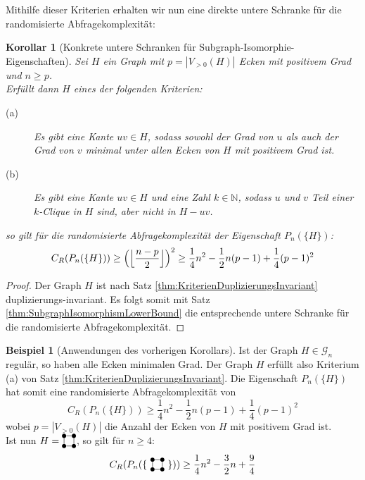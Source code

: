 \documentclass[10pt,a4paper, footheight=1mm]{scrreprt}
\newtheorem{corollary}[definition]{Korollar}
\theoremstyle{definition}
\newtheorem{examplex}{Beispiel}
\newenvironment{example}[1]
{ \begin{leftbar} \begin{examplex}#1}
{ \end{examplex} \ignorespacesafterend \end{leftbar} }
\newcommand{\Square}{
\begin{tikzpicture}[main_node/.style={circle,fill=black},
inner sep=1.5pt, baseline=2pt]

    \node[main_node] (1) at (0,0) {};
    \node[main_node] (2) at (0.35, 0)  {};
    \node[main_node] (3) at (0.35, 0.35) {};
    \node[main_node] (4) at (0, 0.35) {};

    \draw (1) -- (2) -- (3) -- (4) -- (1);
\end{tikzpicture}
}
\begin{document}
Mithilfe dieser Kriterien erhalten wir nun
eine direkte untere Schranke für die randomisierte Abfragekomplexität:
\begin{corollary}[Konkrete untere Schranken für Subgraph-Isomorphie-Eigenschaften]
Sei $H$ ein Graph mit $p=|V_{>0}(H)|$ Ecken mit positivem Grad
und $n \geq p$. \\
Erfüllt dann $H$ eines der folgenden Kriterien:
\begin{description}
\item[(a)] Es gibt eine Kante $uv\in H$, sodass sowohl
           der Grad von $u$ als auch der Grad von $v$
           minimal unter allen Ecken von $H$ mit positivem
           Grad ist.
\item[(b)] Es gibt eine Kante $uv \in H$ und eine Zahl
           $k\in \mathbb{N}$, sodass $u$ und $v$
           Teil einer $k$-Clique in $H$ sind, aber nicht
           in $H-uv$.
\end{description}
so gilt für die randomisierte Abfragekomplexität der Eigenschaft 
$P_n(\{H\})$:
$$ C_R(P_n(\{H\})) \geq
\Big{ ( } \Big \lfloor  \frac{n-p}{2} \Big \rfloor \Big{)}^{2} \geq
\frac{1}{4}n^2 - \frac{1}{2}n(p-1) + \frac{1}{4}(p-1)^2
$$
\end{corollary}
\begin{proof}
Der Graph $H$ ist nach Satz \ref{thm:KriterienDuplizierungsInvariant}
duplizierungs-invariant. Es folgt somit mit 
Satz \ref{thm:SubgraphIsomorphismLowerBound} die entsprechende
untere Schranke für die randomisierte Abfragekomplexität.
\end{proof}

\begin{example}[Anwendungen des vorherigen Korollars]
Ist der Graph $H\in\mathcal{G}_n$ regulär, so haben
alle Ecken minimalen Grad. Der Graph $H$ erfüllt also Kriterium (a)
von Satz \ref{thm:KriterienDuplizierungsInvariant}.
Die Eigenschaft $P_n(\{H\})$ hat somit eine randomisierte
Abfragekomplexität von 
$$ C_R(P_n(\{H\})) \geq
\frac{1}{4}n^2 - \frac{1}{2}n(p-1) + \frac{1}{4}(p-1)^2$$
wobei $p=|V_{>0}(H)|$ die Anzahl der Ecken von $H$ mit
positivem Grad ist. \\
Ist nun $H=\Square$, so gilt für $n\geq 4$:
$$ C_R(P_n(\{\ \Square \ \})) \geq
\frac{1}{4}n^2 - \frac{3}{2}n + \frac{9}{4}$$
\end{example}
\end{document}
